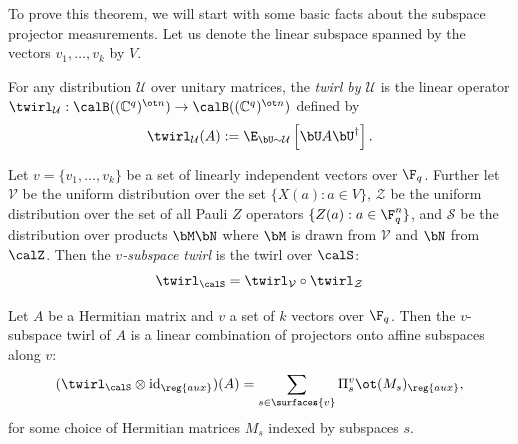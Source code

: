 To prove this theorem,  we will start with some basic facts about the subspace projector
  measurements. Let us denote the linear subspace spanned by the
  vectors $v_1, \dots, v_k$ by $V$.
  
  \begin{definition}
    For any distribution $\mathcal{U}$ over unitary matrices,
    the \emph{twirl by
      $\mathcal{U}$} is the linear operator $\twirl_{\mathcal{U}} :
    \calB((\mathbb{C}^q)^{\ot n}) \to \calB((\mathbb{C}^q)^{\ot n})$
    defined by
    \[ \twirl_{\mathcal{U}}(A) := \E_{\bU \sim \mathcal{U}} \left[ \bU A
        \bU^\dagger \right]. \]
  \end{definition}
  \begin{definition}
    Let $v = \{v_1, \dots, v_k\}$ be a set of linearly independent
    vectors over $\F_q$. Further let $\mathcal{V}$ be the uniform
    distribution over the set $\{X(a): a \in V \}$, $\mathcal{Z}$ be
    the uniform distribution over the set of all Pauli $Z$ operators
    $\{Z(a): a \in \F_q^n\}$, and $\mathcal{S}$ be the distribution
    over products $\bM\bN$ where $\bM$ is drawn from $\mathcal{V}$ and $\bN$
    from $\calZ$. Then the \emph{$v$-subspace twirl} is the
    twirl over $\calS$:
    \[ \twirl_{\calS} = \twirl_{\mathcal{V}} \circ \twirl_{\mathcal{Z}} \]
  \end{definition}
  \begin{proposition}
    \label{prop:hidden-subspace-twirl}
    Let $A$ be a Hermitian matrix and $v$ a set of $k$ vectors over $\F_q$. Then the $v$-subspace twirl of
    $A$ is a linear combination of projectors onto affine subspaces
    along $v$:
    \[ (\twirl_{\calS} \otimes \mathrm{id}_{\reg{aux}})(A) = \sum_{s \in \surfaces{v}}
      \Pi^{v}_{s} \ot (M_s)_{\reg{aux}} , \]
    for some choice of Hermitian matrices $M_s$ indexed by subspaces $s$.
  \end{proposition}

